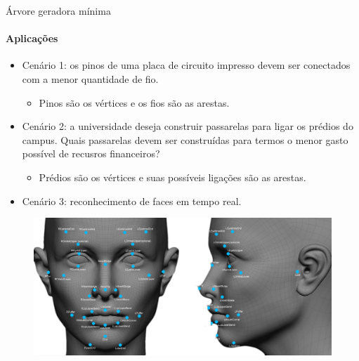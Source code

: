 \begin{frame}{Árvore geradora mínima}
	\framesubtitle{Aplicações}
	
	\begin{itemize}
		\item {\color{magenta}Cenário 1:} os pinos de uma placa de circuito impresso devem ser conectados com a menor quantidade de fio.
		\begin{itemize}
			\item Pinos são os vértices e os fios são as arestas.
		\end{itemize}
		
		\item {\color{magenta}Cenário 2:} a universidade deseja construir passarelas para ligar os prédios do campus. Quais passarelas devem ser construídas para termos o menor gasto possível de recusros financeiros?
		\begin{itemize}
			\item Prédios são os vértices e suas possíveis ligações são as arestas.
		\end{itemize}
		
		\item {\color{magenta}Cenário 3:} reconhecimento de faces em tempo real.
	\end{itemize}
	
	\begin{figure}
		\centering
		\includegraphics[width=0.55\linewidth]{img/face-recognition}
	\end{figure}
\end{frame}



